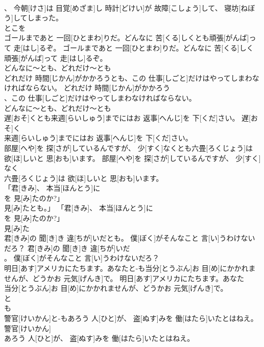 \documentclass[8pt]{extreport}
\begin{document}
\begin{CJK}{UTF8}{min}
\\	、 今朝[けさ]は 目覚[めざま]し 時計[どけい]が 故障[こしょう]して、 寝坊[ねぼう]してしまった。	
\\	とこを 
\\	ゴールまであと 一回[ひとまわ]りだ。どんなに 苦[くる]しくとも頑張[がんば]って 走[はし]るぞ。	ゴールまであと 一回[ひとまわ]りだ。どんなに 苦[くる]しく
\\	頑張[がんば]って 走[はし]るぞ。	
\\	どんなに～とも、どれだけ～とも
\\	どれだけ 時間[じかん]がかかろうとも、この 仕事[しごと]だけはやってしまわなければならない。	どれだけ 時間[じかん]がかかろう
\\	、この 仕事[しごと]だけはやってしまわなければならない。	
\\	どんなに～とも、どれだけ～とも
\\	遅[おそ]くとも来週[らいしゅう]までにはお 返事[へんじ]を 下[くだ]さい。	遅[おそ]く
\\	来週[らいしゅう]までにはお 返事[へんじ]を 下[くだ]さい。	
\\	部屋[へや]を 探[さが]しているんですが、 少[すく]なくとも六畳[ろくじょう]は 欲[ほ]しいと 思[おも]います。	部屋[へや]を 探[さが]しているんですが、 少[すく]なく
\\	六畳[ろくじょう]は 欲[ほ]しいと 思[おも]います。	
\\	「君[きみ]、 本当[ほんとう]に
\\	を 見[み]たのか?」
\\	見[み]たとも。」	「君[きみ]、 本当[ほんとう]に
\\	を 見[み]たのか?」
\\	見[み]た
\\	君[きみ]の 聞[き]き 違[ちが]いだとも。 僕[ぼく]がそんなこと 言[い]うわけないだろ？	君[きみ]の 聞[き]き 違[ちが]いだ
\\	。 僕[ぼく]がそんなこと 言[い]うわけないだろ？	
\\	明日[あす]アメリカにたちます。あなたと-も当分[とうぶん]お 目[め]にかかれませんが、どうかお 元気[げんき]で。	明日[あす]アメリカにたちます。あなた
\\	当分[とうぶん]お 目[め]にかかれませんが、どうかお 元気[げんき]で。	
\\	と 
\\	も
\\	警官[けいかん]と-もあろう 人[ひと]が、 盗[ぬす]みを 働[はたら]いたとはねえ。	警官[けいかん]
\\	あろう 人[ひと]が、 盗[ぬす]みを 働[はたら]いたとはねえ。	

\end{CJK}
\end{document}
